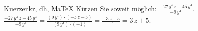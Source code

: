\begin{MAufgabe}{Kuerzen}{kr, dh, MaTeX}
K\"urzen Sie soweit m\"oglich: $\frac{ - 27\, y^4\, z - 45\, y^4}{- 9\, y^4}$.\\ 
\ifLsg\MLoesung
\quad $\frac{ - 27\, y^4\, z - 45\, y^4}{- 9\, y^4}=\frac{(9\, y^4)\cdot( - 3\, z - 5)}{(9\, y^4)\cdot(-1)}=\frac{ - 3\, z - 5}{-1}=3\, z + 5$.\else\relax\fi
 \end{MAufgabe}